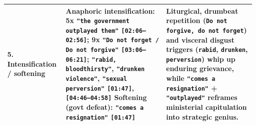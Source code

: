\documentclass[10pt,a4paper]{article}
\begin{document}
\begin{longtable}{@{}>{\raggedright\arraybackslash}p{} >{\raggedright\arraybackslash}p{} >{\raggedright\arraybackslash}p{}@{}}
\addlinespace[4pt]
\textbf{5. Intensification / softening} & \textbf{Anaphoric intensification:} 5x \texttt{"the government outplayed them"} \texttt{[02:06--02:56]}; 9x \texttt{"Do not forget / Do not forgive"} \texttt{[03:06--06:21]}; \texttt{"rabid, bloodthirsty"}, \texttt{"drunken violence"}, \texttt{"sexual perversion"} \texttt{[01:47]}, \texttt{[04:46--04:58]} \newline  \textbf{Softening (govt defeat):} \texttt{"comes a resignation"} \texttt{[01:47]} & Liturgical, drumbeat repetition (\texttt{Do not forgive, do not forget}) and visceral disgust triggers (\texttt{rabid}, \texttt{drunken}, \texttt{perversion}) whip up enduring grievance, while \texttt{"comes a resignation"} + \texttt{"outplayed"} reframes ministerial capitulation into strategic genius. \\
\bottomrule
\end{longtable}
\end{document}
